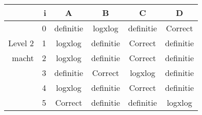 \begin{tabular}{ rr| c|c|c|c}\hline\hline
     & i & \textbf{A} & \textbf{B} & \textbf{C} & \textbf{D}\\\hline

&0&definitie&logxlog&definitie&Correct\cellcolor[gray]{0.6}\\
Level 2 & 1&logxlog&definitie&Correct\cellcolor[gray]{0.6}&definitie\\
macht &2&logxlog&definitie&Correct\cellcolor[gray]{0.6}&definitie\\
&3&definitie&Correct\cellcolor[gray]{0.6}&logxlog&definitie\\
&4&logxlog&definitie&Correct\cellcolor[gray]{0.6}&definitie\\
&5&Correct\cellcolor[gray]{0.6}&definitie&definitie&logxlog\\
\hline\end{tabular}\par\ \newline

